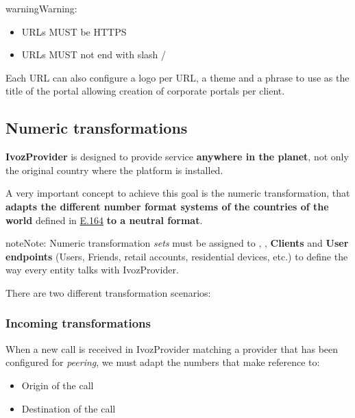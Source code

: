 \documentclass[letterpaper,10pt,english]{sphinxmanual}
\begin{document}
\begin{notice}{warning}{Warning:}\begin{itemize}
\item {} 
URLs MUST be HTTPS

\item {} 
URLs MUST not end with slash /

\end{itemize}
\end{notice}

Each URL can also configure a logo per URL, a theme and a phrase to use as
the title of the portal allowing creation of corporate portals per client.


\subsection{Numeric transformations}
\label{administration_portal/brand/settings/numeric_transformations::doc}\label{administration_portal/brand/settings/numeric_transformations:transformations}\label{administration_portal/brand/settings/numeric_transformations:numeric-transformations}
\textbf{IvozProvider} is designed to provide service \textbf{anywhere in the planet}, not
only the original country where the platform is installed.

A very important concept to achieve this goal is the numeric transformation,
that \textbf{adapts the different number format systems of the countries of the world}
defined in \href{https://www.itu.int/rec/T-REC-E.164/es}{E.164} \textbf{to a neutral format}.

\begin{notice}{note}{Note:}
Numeric transformation \emph{sets} must be assigned to {\hyperref[administration_portal/brand/providers/carriers:carriers]{}}, {\hyperref[administration_portal/brand/providers/ddi_providers:ddi\string-providers]{}}, \textbf{Clients} and \textbf{User
endpoints} (Users, Friends, retail accounts, residential devices, etc.) to define the way every entity talks
with IvozProvider.
\end{notice}

There are two different transformation scenarios:


\subsubsection{Incoming transformations}
\label{administration_portal/brand/settings/numeric_transformations:incoming-transformations}
When a new call is received in IvozProvider matching a provider that has been
configured for \emph{peering}, we must adapt the numbers that make reference to:
\begin{itemize}
\item {} 
Origin of the call

\item {} 
Destination of the call

\end{itemize}
\end{document}

